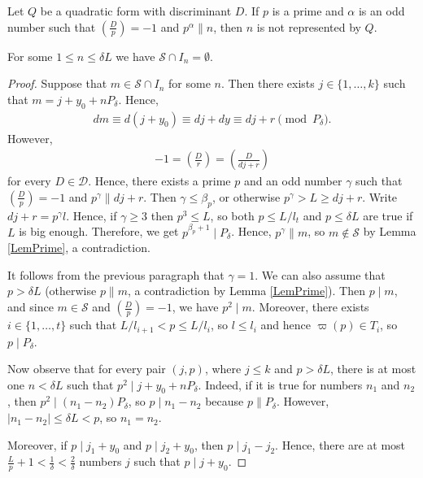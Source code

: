\documentclass[10pt,a4paper]{amsart}
\begin{document}
\begin{lem}\label{LemPrime}
Let $Q$ be a quadratic form with discriminant $D$. If $p$ is a prime and $\alpha$ is an odd number such that $\left(\frac{D}{p}\right)=-1$ and $p^{\alpha}\| n$, then $n$ is not represented by $Q$.
\end{lem}

\begin{lem}
For some $1\leq n \leq \delta L$ we have $\mathcal{S}\cap I_{n}=\emptyset$.
\end{lem}

\begin{proof}
Suppose that $m\in\mathcal{S}\cap I_{n}$ for some $n$. Then there exists $j\in\{1,\ldots,k\}$ such that $m=j+y_{0}+nP_{\delta}$. Hence,
\begin{align*}
dm\equiv d(j+y_{0})\equiv dj+dy\equiv dj+r \pmod{P_{\delta}}.
\end{align*}
However,
\begin{align*}
-1=\left(\frac{D}{r}\right)=\left(\frac{D}{dj+r}\right)
\end{align*}
for every $D\in\mathcal{D}$. Hence, there exists a prime $p$ and an odd number $\gamma$ such that $\left(\frac{D}{p}\right)=-1$ and $p^{\gamma}\| dj+r$. Then $\gamma\leq\beta_{p}$, or otherwise $p^{\gamma}>L\geq dj+r$. Write $dj+r=p^{\gamma}l$. Hence, if $\gamma\geq 3$ then $p^{3}\leq L$, so both $p\leq L/l_{t}$ and $p\leq\delta L$ are true if $L$ is big enough. Therefore, we get $p^{\beta_{p}+1}\mid P_{\delta}$. Hence, $p^{\gamma}\| m$, so $m\not\in\mathcal{S}$ by Lemma \ref{LemPrime}, a contradiction.

It follows from the previous paragraph that $\gamma =1$. We can also assume that $p>\delta L$ (otherwise $p\| m$, a contradiction by Lemma \ref{LemPrime}). Then $p\mid m$, and since $m\in\mathcal{S}$ and $\left(\frac{D}{p}\right)=-1$, we have $p^{2}\mid m$. Moreover, there exists $i\in\{1,\ldots, t\}$ such that $L/l_{i+1}<p\leq L/l_{i}$, so $l\leq l_{i}$ and hence $\varpi (p)\in T_{i}$, so $p\mid P_{\delta}$.

Now observe that for every pair $(j,p)$, where $j\leq k$ and $p>\delta L$, there is at most one $n<\delta L$ such that $p^{2}\mid j+y_{0}+nP_{\delta}$. Indeed, if it is true for numbers $n_{1}$ and $n_{2}$, then $p^{2}\mid (n_{1}-n_{2})P_{\delta}$, so $p\mid n_{1}-n_{2}$ because $p\| P_{\delta}$. However, $|n_{1}-n_{2}|\leq \delta L<p$, so $n_{1}=n_{2}$.

Moreover, if $p\mid j_{1}+y_{0}$ and $p\mid j_{2}+y_{0}$, then $p\mid j_{1}-j_{2}$. Hence, there are at most $\frac{L}{p}+1<\frac{1}{\delta}<\frac{2}{\delta}$ numbers $j$ such that $p\mid j+y_{0}$.


\end{proof}
\end{document}
